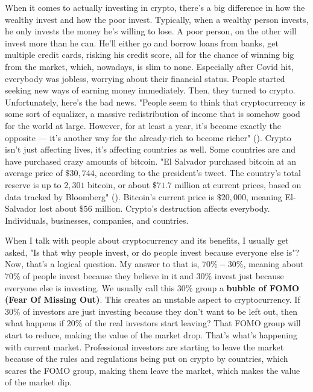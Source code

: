 \begin{essay}
  When it comes to actually investing in crypto, there's a big difference in
  how the wealthy invest and how the poor invest. Typically, when a wealthy
  person invests, he only invests the money he's willing to lose. A poor
  person, on the other will invest more than he can. He'll either go and borrow
  loans from banks, get multiple credit cards, risking his credit score, all
  for the chance of winning big from the market, which, nowadays, is slim to
  none. Especially after Covid hit, everybody was jobless, worrying about their
  financial status. People started seeking new ways of earning money
  immediately. Then, they turned to crypto. Unfortunately, here's the bad news.
  "People seem to think that cryptocurrency is some sort of equalizer, a
  massive redistribution of income that is somehow good for the world at large.
  However, for at least a year, it’s become exactly the opposite — it’s another
  way for the already-rich to become richer" (\cite{zitron_only_2018}). Crypto
  isn't just affecting lives, it's affecting countries as well. Some countries
  are and have purchased crazy amounts of bitcoin. "El Salvador purchased
  bitcoin at an average price of $\$30,744$, according to the president’s
  tweet. The country’s total reserve is up to $2,301$ bitcoin, or about
  $\$71.7$ million at current prices, based on data tracked by Bloomberg"
  (\cite{sigalos_salvador_2022}). Bitcoin's current price is $\$20,000$,
  meaning El-Salvador lost about $\$56$ million. Crypto's destruction
  affects everybody. Individuals, businesses, companies, and countries.


  When I talk with people about cryptocurrency and its benefits, I usually get
  asked, "Is that why people invest, or do people invest because everyone else
  is"? Now, that's a logical question. My answer to that is, $70\%-30\%
  $, meaning about $70\%$ of people invest because they believe in it and
  $30\%$ invest just because everyone else is investing. We usually call this
  $30\%$ group a \textbf{bubble of FOMO (Fear Of Missing Out)}. This creates an
  unstable aspect to cryptocurrency. If $30\%$ of investors are just investing
  because they don't want to be left out, then what happens if $20\%$ of the
  real investors start leaving? That FOMO group will start to reduce, making
  the value of the market drop. That's what's happening with current market.
  Professional investors are starting to leave the market because of the rules
  and regulations being put on crypto by countries, which scares the FOMO
  group, making them leave the market, which makes the value of the market dip.


\end{essay}
